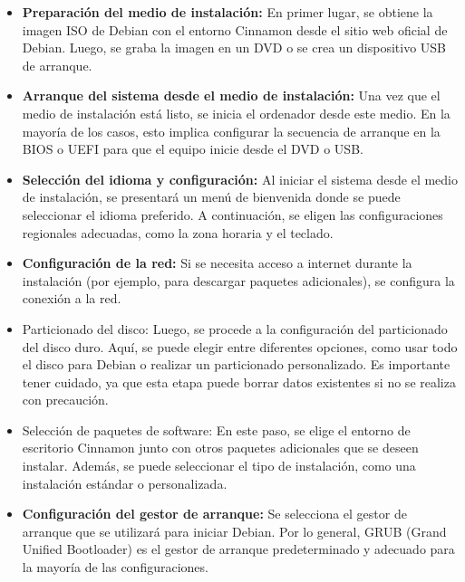 			
			\begin{itemize}
				
				\item \textbf{Preparación del medio de instalación:} En primer lugar, se obtiene la imagen ISO de Debian con el entorno Cinnamon desde el sitio web oficial de Debian. Luego, se graba la imagen en un DVD o se crea un dispositivo USB de arranque.
					
				\item \textbf{Arranque del sistema desde el medio de instalación:} Una vez que el medio de instalación está listo, se inicia el ordenador desde este medio. En la mayoría de los casos, esto implica configurar la secuencia de arranque en la BIOS o UEFI para que el equipo inicie desde el DVD o USB.
					
				\item \textbf{Selección del idioma y configuración:} Al iniciar el sistema desde el medio de instalación, se presentará un menú de bienvenida donde se puede seleccionar el idioma preferido. A continuación, se eligen las configuraciones regionales adecuadas, como la zona horaria y el teclado.
					
				\item \textbf{Configuración de la red:} Si se necesita acceso a internet durante la instalación (por ejemplo, para descargar paquetes adicionales), se configura la conexión a la red.
					
				\item {Particionado del disco:} Luego, se procede a la configuración del particionado del disco duro. Aquí, se puede elegir entre diferentes opciones, como usar todo el disco para Debian o realizar un particionado personalizado. Es importante tener cuidado, ya que esta etapa puede borrar datos existentes si no se realiza con precaución.
					
				\item Selección de paquetes de software: En este paso, se elige el entorno de escritorio Cinnamon junto con otros paquetes adicionales que se deseen instalar. Además, se puede seleccionar el tipo de instalación, como una instalación estándar o personalizada.
					
				\item \textbf{Configuración del gestor de arranque:} Se selecciona el gestor de arranque que se utilizará para iniciar Debian. Por lo general, GRUB (Grand Unified Bootloader) es el gestor de arranque predeterminado y adecuado para la mayoría de las configuraciones.
					

\end{itemize}
